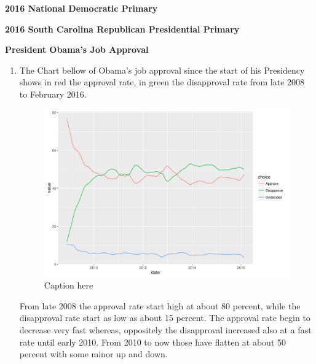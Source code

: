 \documentclass{article}[14pt]
\begin{document}
\bigskip
\begin{section}
{ \bf \large 2016 National Democratic  Primary} 
\bigskip
\end{section}

\begin{section}
{\bf \large 2016 South Carolina Republican Presidential Primary}
\bigskip
\end{section}

\begin{section}
{\bf \large President Obama's Job Approval}
\begin{enumerate}[]
\item {}


The Chart bellow of Obama's job approval since the start of his Presidency shows in red the approval rate, in green the disapproval rate from late 2008 to February 2016.

\begin{figure}[htb]
\begin{center}
\includegraphics[width=\linewidth]{O_job_app.png}
\end{center}
\caption{Caption here}
\label{fig:figure4}
\end{figure}

From late 2008 the approval rate start high at about 80 percent, while the disapproval rate start as low as about 15 percent. The approval rate begin to decrease very fast whereas, oppositely the disapproval increased also at a fast rate until early 2010. From 2010 to now those have flatten at about 50 percent with some minor up and down.
\medspace


\end{enumerate}
\end{section}
\end{document}
